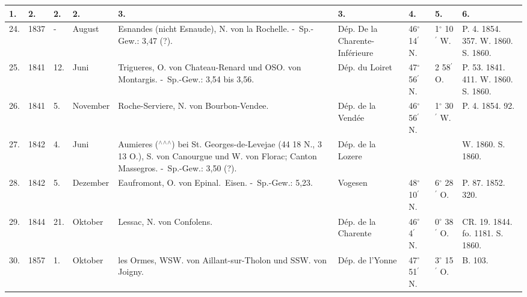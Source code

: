 \documentclass[a4paper, 11pt, oneside, polutonikogreek, german]{article}
\begin{document}
\begin{landscape}
\begin{table}[!ht]
    \centering
    \footnotesize
    \begin{tabular}{|p{5mm}|p{9mm}|p{5mm}|p{15mm}|p{48mm}|p{25mm}|l|l|p{11mm}|}
    \hline
        1. & 2. & 2. & 2. & 3. & 3. & 4. & 5. & 6. \\ \hline
        24. & 1837 & - & August & Esnandes (nicht Esnaude), N. von la Rochelle. - Sp.-Gew.: 3,47 (?). & Dép. De la Charente-Inférieure & 46$^\circ$ 14$^\prime$ N. & 1$^\circ$ 10$^\prime$ W. & P. 4. 1854. 357. W. 1860. S. 1860. \\ \hline
        25. & 1841 & 12. & Juni & Trigueres, O. von Chateau-Renard und OSO. von Montargis. - Sp.-Gew.: 3,54 bis 3,56. & Dép. du Loiret & 47$^\circ$ 56$^\prime$ N. & 2 58$^\prime$ O. & P. 53. 1841. 411. W. 1860. S. 1860. \\ \hline
        26. & 1841 & 5. & November & Roche-Serviere, N. von Bourbon-Vendee. & Dép. de la Vendée & 46$^\circ$ 56$^\prime$ N. & 1$^\circ$ 30$^\prime$ W. & P. 4. 1854. 92. \\ \hline
        27. & 1842 & 4. & Juni & Aumieres ($^\wedge$$^\wedge$$^\wedge$) bei St. Georges-de-Levejae (44 18 N., 3 13 O.), S. von Canourgue und W. von Florac; Canton Massegros. - Sp.-Gew.: 3,50 (?). & Dép. de la Lozere & ~ & ~ & W. 1860. S. 1860. \\ \hline
        28. & 1842 & 5. & Dezember & Eaufromont, O. von Epinal. Eisen. - Sp.-Gew.: 5,23. & Vogesen & 48$^\circ$ 10$^\prime$ N. & 6$^\circ$ 28$^\prime$ O. & P. 87. 1852. 320. \\ \hline
        29. & 1844 & 21. & Oktober & Lessac, N. von Confolens. & Dép. de la Charente & 46$^\circ$ 4$^\prime$ N. & 0$^\circ$ 38$^\prime$ O. & CR. 19. 1844. fo. 1181. S. 1860. \\ \hline
        30. & 1857 & 1. & Oktober & les Ormes, WSW. von Aillant-sur-Tholon und SSW. von Joigny. & Dép. de l’Yonne & 47$^\circ$ 51$^\prime$ N. & 3$^\circ$ 15$^\prime$ O. & B. 103. \\ \hline
    \end{tabular}
\end{table}
\end{landscape}
\clearpage
\end{document}
